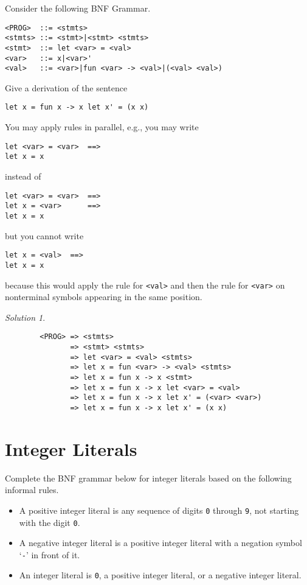 \documentclass{article}
\theoremstyle{remark} \newtheorem*{solution}{Solution}
\begin{document}
Consider the following BNF Grammar.
\begin{lstlisting}
<PROG>  ::= <stmts>
<stmts> ::= <stmt>|<stmt> <stmts>
<stmt>  ::= let <var> = <val>
<var>   ::= x|<var>'
<val>   ::= <var>|fun <var> -> <val>|(<val> <val>)
\end{lstlisting}
Give a derivation of the sentence
\begin{lstlisting}
let x = fun x -> x let x' = (x x)
\end{lstlisting}
You may apply rules in parallel, e.g., you may write
\begin{lstlisting}
let <var> = <var>  ==>
let x = x
\end{lstlisting}
instead of
\begin{lstlisting}
let <var> = <var>  ==>
let x = <var>      ==>
let x = x
\end{lstlisting}
but you cannot write
\begin{lstlisting}
let x = <val>  ==>
let x = x
\end{lstlisting}
because this would apply the rule for \texttt{<val>} and then the rule
for \texttt{<var>} on nonterminal symbols appearing in the same
position.

\begin{solution}
\indent
    \begin{lstlisting}
        <PROG> => <stmts>
               => <stmt> <stmts>
               => let <var> = <val> <stmts>
               => let x = fun <var> -> <val> <stmts>
               => let x = fun x -> x <stmt>
               => let x = fun x -> x let <var> = <val>
               => let x = fun x -> x let x' = (<var> <var>)
               => let x = fun x -> x let x' = (x x)
    \end{lstlisting}
\end{solution}



\pagebreak
\section{Integer Literals}

Complete the BNF grammar below for integer literals based on the following informal rules.
\begin{itemize}
\item A positive integer literal is any sequence of digits \texttt{0} through \texttt{9}, not starting with the digit \texttt{0}.
\item A negative integer literal is a positive integer literal with a negation symbol `\texttt{-}' in front of it.
\item An integer literal is \texttt{0}, a positive integer literal, or a negative integer literal.
\end{itemize}
\end{document}
